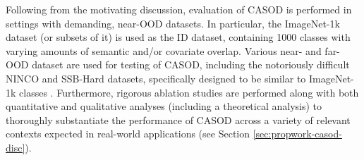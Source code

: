 Following from the motivating discussion, evaluation of CASOD is performed in settings with demanding, near-OOD datasets. In particular, the ImageNet-1k dataset \cite{russakovsky2015imagenet} (or subsets of it) is used as the ID dataset, containing 1000 classes with varying amounts of semantic and/or covariate overlap. Various near- and far-OOD dataset are used for testing of CASOD, including the notoriously difficult NINCO \cite{bitterwolf2023or} and SSB-Hard \cite{vaze2021open} datasets, specifically designed to be similar to ImageNet-1k classes \cite{zhang2023openood}. Furthermore, rigorous ablation studies are performed along with both quantitative and qualitative analyses (including a theoretical analysis) to thoroughly substantiate the performance of CASOD across a variety of relevant contexts expected in real-world applications (see Section \ref{sec:propwork-casod-disc}).

